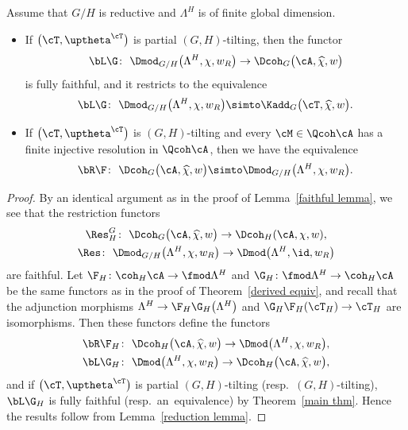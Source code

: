 \begin{thm}\label{tilt and fact}
Assume that $G/H$ is reductive and $\Lambda^H$ is of finite global dimension.
\begin{itemize}\itemsep=0pt
\item[$1.$] If $\big(\cT,\uptheta^{\cT}\big)$ is partial $(G,H)$-tilting, then the functor
\begin{gather*}
\bL\G\colon\ \Dmod_{G/H}\big(\Lambda^H,\chi,w_R\big)\to \Dcoh_{G}\big(\cA,\widehat{\chi},w\big)
\end{gather*}
is fully faithful, and it restricts to the equivalence
\begin{gather*}
\bL\G\colon\ \Dmod_{G/H}\big(\Lambda^H,\chi,w_R\big)\simto \Kadd_{G}\big(\cT,\widehat{\chi},w\big).
\end{gather*}
\item[$2.$] If $\big(\cT,\uptheta^{\cT}\big)$ is $(G,H)$-tilting and every $\cM\in \Qcoh\cA$ has a finite injective resolution in $\Qcoh\cA$, then we have the equivalence
\begin{gather*}
\bR\F\colon\ \Dcoh_{G}\big(\cA,\widehat{\chi},w\big)\simto \Dmod_{G/H}\big(\Lambda^H,\chi,w_R\big).
\end{gather*}
\end{itemize}
\begin{proof}
By an identical argument as in the proof of Lemma~\ref{faithful lemma}, we see that the restriction functors
\begin{gather*}
\Res^G_H\colon\ \Dcoh_G\big(\cA,\widehat{\chi},w\big)\to \Dcoh_H(\cA,\chi,w),
\\
\Res\colon\ \Dmod_{G/H}\big(\Lambda^H,\chi,w_R\big)\to \Dmod\big(\Lambda^H,\id,w_R\big)
\end{gather*}
are faithful. Let $\F_H\colon \coh_H\cA\to\fmod\Lambda^H$ and $\G_H\colon\fmod\Lambda^H\to\coh_H\cA$
be the same functors as in the proof of Theorem~\ref{derived equiv}, and recall that the adjunction morphisms
$\Lambda^H\to \F_H\G_H\big(\Lambda^H\big)$ and $\G_H\F_H(\cT_H)\to \cT_H$
are isomorphisms. Then these functors define the functors
\begin{gather*}
\bR\F_H\colon\ \Dcoh_H\big(\cA,\widehat{\chi},w\big)\to \Dmod\big(\Lambda^H,\chi,w_R\big),
\\
\bL\G_H\colon\ \Dmod\big(\Lambda^H,\chi,w_R\big)\to \Dcoh_H\big(\cA,\widehat{\chi},w\big),
\end{gather*}
and if $\big(\cT,\uptheta^{\cT}\big)$ is partial $(G,H)$-tilting (resp.\ $(G,H)$-tilting), $\bL\G_H$ is fully faithful (resp.\ an~equi\-valence) by Theorem~\ref{main thm}.
Hence the results follow from Lemma~\ref{reduction lemma}.
\end{proof}
\end{thm}
